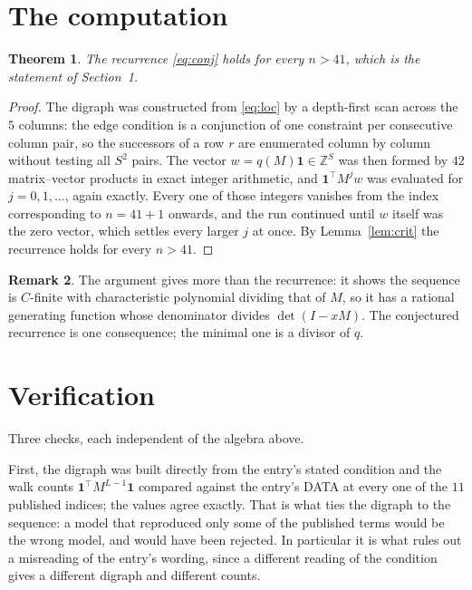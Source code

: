 \documentclass[11pt,a4paper]{article}
\theoremstyle{plain}
\newtheorem{theorem}{Theorem}
\theoremstyle{definition}
\newtheorem{remark}[theorem]{Remark}
\begin{document}
\section{The computation}

\begin{theorem}
The recurrence \eqref{eq:conj} holds for every $n>41$, which is the statement of
Section~1.
\end{theorem}

\begin{proof}
The digraph was constructed from \eqref{eq:loc} by a depth-first scan across the $5$
columns: the edge condition is a conjunction of one constraint per consecutive column
pair, so the successors of a row $r$ are enumerated column by column without testing all
$S^2$ pairs. The vector $w=q(M)\mathbf{1}\in\mathbb{Z}^{S}$ was then formed by $42$
matrix--vector products in exact integer arithmetic, and $\mathbf{1}^{\!\top}M^{j}w$ was
evaluated for $j=0,1,\dots$, again exactly. Every one of those integers vanishes from the
index corresponding to $n=41+1$ onwards, and the run continued until $w$ itself was the
zero vector, which settles every larger $j$ at once. By Lemma~\ref{lem:crit} the recurrence
holds for every $n>41$.
\end{proof}

\begin{remark}
The argument gives more than the recurrence: it shows the sequence is $C$-finite with
characteristic polynomial dividing that of $M$, so it has a rational generating function
whose denominator divides $\det(I-xM)$. The conjectured recurrence is one consequence; the
minimal one is a divisor of $q$.
\end{remark}

\section{Verification}

Three checks, each independent of the algebra above.

First, the digraph was built directly from the entry's stated condition and the walk counts
$\mathbf{1}^{\!\top}M^{L-1}\mathbf{1}$ compared against the entry's DATA at
every one of the $11$ published indices; the values agree exactly. That is what ties
the digraph to the sequence: a model that reproduced only some of the published terms would
be the wrong model, and would have been rejected. In particular it is what rules out a
misreading of the entry's wording, since a different reading of the condition gives a
different digraph and different counts.
\end{document}
